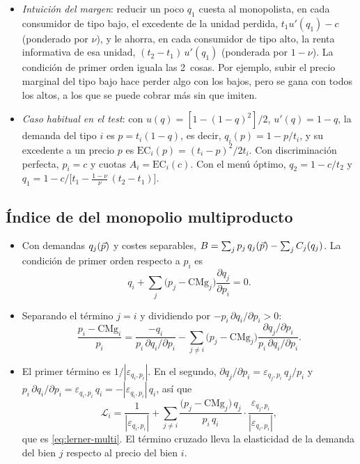 \documentclass[11pt]{article}
\begin{document}
\begin{itemize}
\item \emph{Intuición del margen}: reducir un poco $q_1$ cuesta al monopolista, en cada consumidor de tipo bajo, el excedente de la unidad perdida, $t_1u'(q_1)-c$ (ponderado por $\nu$), y le ahorra, en cada consumidor de tipo alto, la renta informativa de esa unidad, $(t_2-t_1)\,u'(q_1)$ (ponderada por $1-\nu$). La condición de primer orden iguala las 2~cosas. Por ejemplo, subir el precio marginal del tipo bajo hace perder algo con los bajos, pero se gana con todos los altos, a los que se puede cobrar más sin que imiten.
\item \emph{Caso habitual en el test}: con $u(q)=[1-(1-q)^2]/2$, $u'(q)=1-q$, la demanda del tipo $i$ es $p=t_i(1-q)$, es decir, $q_i(p)=1-p/t_i$, y su excedente a un precio $p$ es $\mathrm{EC}_i(p)=(t_i-p)^2/2t_i$. Con discriminación perfecta, $p_i=c$ y cuotas $A_i=\mathrm{EC}_i(c)$. Con el menú óptimo, $q_2=1-c/t_2$ y $q_1=1-c\big/\big[t_1-\frac{1-\nu}{\nu}\,(t_2-t_1)\big]$.
\end{itemize}

\subsection{Índice de  del monopolio multiproducto}\label{anexo:multiproducto}

\begin{itemize}
\item Con demandas $q_j(\vec{p})$ y costes separables, $B=\sum_jp_j\,q_j(\vec{p})-\sum_jC_j(q_j)$. La condición de primer orden respecto a $p_i$ es
  \begin{equation}
  q_i+\sum_j\big(p_j-\mathrm{CMg}_j\big)\frac{\partial q_j}{\partial p_i}=0 .
  \end{equation}
\item Separando el término $j=i$ y dividiendo por $-p_i\,\partial q_i/\partial p_i>0$:
  \begin{equation}
  \frac{p_i-\mathrm{CMg}_i}{p_i}=\frac{-q_i}{p_i\,\partial q_i/\partial p_i}-\sum_{j\neq i}\big(p_j-\mathrm{CMg}_j\big)\frac{\partial q_j/\partial p_i}{p_i\,\partial q_i/\partial p_i}.
  \end{equation}
\item El primer término es $1/|\varepsilon_{q_i,p_i}|$. En el segundo, $\partial q_j/\partial p_i=\varepsilon_{q_j,p_i}\,q_j/p_i$ y $p_i\,\partial q_i/\partial p_i=\varepsilon_{q_i,p_i}\,q_i=-|\varepsilon_{q_i,p_i}|\,q_i$, así que
  \begin{equation}
  \mathcal{L}_i=\frac{1}{|\varepsilon_{q_i,p_i}|}+\sum_{j\neq i}\frac{\big(p_j-\mathrm{CMg}_j\big)\,q_j}{p_i\,q_i}\cdot\frac{\varepsilon_{q_j,p_i}}{|\varepsilon_{q_i,p_i}|},
  \end{equation}
  que es \eqref{eq:lerner-multi}. El término cruzado lleva la elasticidad de la demanda del bien $j$ respecto al precio del bien $i$.\findemo
\end{itemize}
\end{document}
